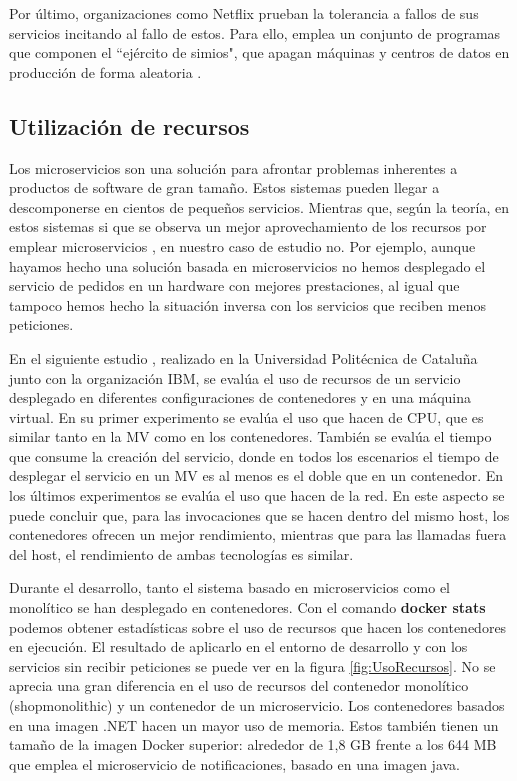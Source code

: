 \documentclass[11pt,spanish,listoffigures]{tfgetsinf}
\begin{document}
Por último, organizaciones como Netflix prueban la tolerancia a fallos de sus servicios incitando al fallo de estos. Para ello, emplea un conjunto de programas que componen el ``ejército de simios", que apagan máquinas y centros de datos en producción de forma aleatoria \cite{Lewis2014}.

\subsection{Utilización de recursos}

Los microservicios son una solución para afrontar problemas inherentes a productos de software de gran tamaño. Estos sistemas pueden llegar a descomponerse en cientos de pequeños servicios. Mientras que, según la teoría, en estos sistemas si que se observa un mejor aprovechamiento de los recursos por emplear microservicios \cite{DelaTorre2018}, en nuestro caso de estudio no. Por ejemplo, aunque hayamos hecho una solución basada en microservicios no hemos desplegado el servicio de pedidos en un hardware con mejores prestaciones, al igual que tampoco hemos hecho la situación inversa con los servicios que reciben menos peticiones.

En el siguiente estudio \cite{Amaral2016}, realizado en la Universidad Politécnica de Cataluña junto con la organización IBM, se evalúa el uso de recursos de un servicio desplegado en diferentes configuraciones de contenedores y en una máquina virtual. En su primer experimento se evalúa el uso que hacen de CPU, que es similar tanto en la MV como en los contenedores. También se evalúa el tiempo que consume la creación del servicio, donde en todos los escenarios el tiempo de desplegar el servicio en un MV es al menos es el doble que en un contenedor. En los últimos experimentos se evalúa el uso que hacen de la red. En este aspecto se puede concluir que, para las invocaciones que se hacen dentro del mismo host, los contenedores ofrecen un mejor rendimiento, mientras que para las llamadas fuera del host, el rendimiento de ambas tecnologías es similar.

Durante el desarrollo, tanto el sistema basado en microservicios como el monolítico se han desplegado en contenedores. Con el comando \textbf{docker stats} podemos obtener estadísticas sobre el uso de recursos que hacen los contenedores en ejecución. El resultado de aplicarlo en el entorno de desarrollo y con los servicios sin recibir peticiones se puede ver en la figura \ref{fig:UsoRecursos}. No se aprecia una gran diferencia en el uso de recursos del contenedor monolítico (shopmonolithic) y un contenedor de un microservicio. Los contenedores basados en una imagen .NET hacen un mayor uso de memoria. Estos también tienen un tamaño de la imagen Docker superior: alrededor de 1,8 GB frente a los 644 MB que emplea el microservicio de notificaciones, basado en una imagen java.
\end{document}
